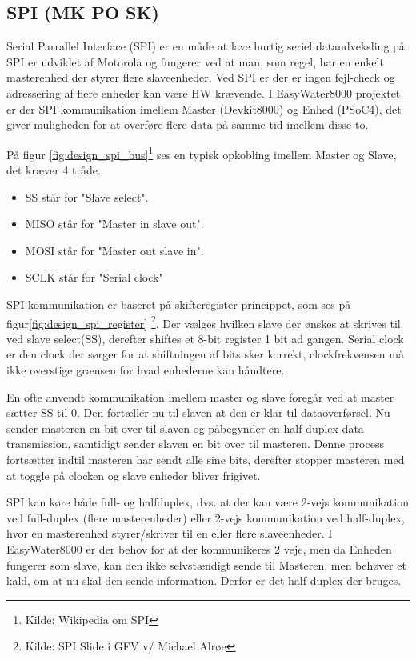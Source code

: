 \subsection{SPI (MK PO SK)}

Serial Parrallel Interface (SPI) er en måde at lave hurtig seriel dataudveksling på. SPI er udviklet af Motorola og fungerer ved at man, som regel, har en enkelt masterenhed der styrer flere slaveenheder. Ved SPI er der er ingen fejl-check og adressering af flere enheder kan være HW krævende. I EasyWater8000 projektet er der SPI kommunikation imellem Master (Devkit8000) og Enhed (PSoC4), det giver muligheden for at overføre flere data på samme tid imellem disse to.


På figur \ref{fig:design_spi_bus}\footnote{Kilde: Wikipedia om SPI} ses en typisk opkobling imellem Master og Slave, det kræver 4 tråde.

\begin{itemize}
 	\item SS står for "Slave select".
 	\item MISO står for "Master in slave out".
 	\item MOSI står for "Master out slave in". 
	\item SCLK står for "Serial clock" 
\end{itemize}

SPI-kommunikation er baseret på skifteregister princippet, som ses på figur\ref{fig:design_spi_register} \footnote{Kilde: SPI Slide i GFV v/ Michael Alrøe}. Der vælges hvilken slave der ønskes at skrives til ved slave select(SS), derefter shiftes et 8-bit register 1 bit ad gangen. Serial clock er den clock der sørger for at shiftningen af bits sker korrekt, clockfrekvensen må ikke overstige grænsen for hvad enhederne kan håndtere.


En ofte anvendt kommunikation imellem master og slave foregår ved at master sætter SS til 0. Den fortæller nu til slaven at den er klar til 
dataoverførsel. Nu sender masteren en bit over til slaven og påbegynder en half-duplex data transmission, samtidigt sender slaven en bit over til masteren. Denne process fortsætter indtil masteren har sendt alle sine bits, derefter stopper masteren med at toggle på clocken og slave enheder bliver frigivet.

SPI kan køre både full- og halfduplex, dvs. at der kan være 2-vejs kommunikation ved full-duplex (flere masterenheder) eller 2-vejs kommunikation ved half-duplex, hvor en masterenhed styrer/skriver til en eller flere slaveenheder. I EasyWater8000 er der behov for at der kommunikeres 2 veje, men da Enheden fungerer som slave, kan den ikke selvstændigt sende til Masteren, men behøver et kald, om at nu skal den sende information. Derfor er det half-duplex der bruges.